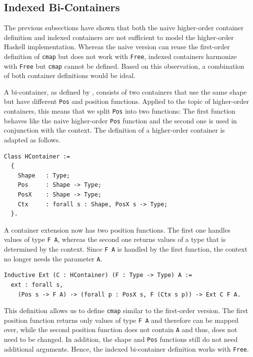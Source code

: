 \documentclass[a4paper, 11pt, fleqn, twoside]{scrreprt}
\newcommand{\cinl}[1]{\texttt{#1}}
\begin{document}
\subsection{Indexed Bi-Containers}
The previous subsections have shown that both the naive higher-order container definition and indexed containers are not sufficient to model the higher-order Haskell implementation.
Whereas the naive version can reuse the first-order definition of \cinl{cmap} but does not work with \cinl{Free}, indexed containers harmonize with \cinl{Free} but \cinl{cmap} cannot be defined.
Based on this observation, a combination of both container definitions would be ideal.

A bi-container, as defined by \citet{ghani2007higherDimensional}, consists of two containers that use the same shape but have different \cinl{Pos} and position functions.
Applied to the topic of higher-order containers, this means that we split \cinl{Pos} into two functions: The first function behaves like the naive higher-order \cinl{Pos} function and the second one is used in conjunction with the context.
The definition of a higher-order container is adapted as follows.

\begin{verbatim}
Class HContainer :=
  {
    Shape   : Type;
    Pos     : Shape -> Type;
    PosX    : Shape -> Type;
    Ctx     : forall s : Shape, PosX s -> Type;
  }.
\end{verbatim}

A container extension now has two position functions.
The first one handles values of type \cinl{F A}, whereas the second one returns values of a type that is determined by the context.
Since \cinl{F A} is handled by the first function, the context no longer needs the parameter \cinl{A}.

\begin{verbatim}
Inductive Ext (C : HContainer) (F : Type -> Type) A :=
  ext : forall s, 
    (Pos s -> F A) -> (forall p : PosX s, F (Ctx s p)) -> Ext C F A.
\end{verbatim}

This definition allows us to define \cinl{cmap} similar to the first-order version.
The first position function returns only values of type \cinl{F A} and therefore can be mapped over, while the second position function does not contain \cinl{A} and thus, does not need to be changed.
In addition, the shape and \cinl{Pos} functions still do not need additional arguments.
Hence, the indexed bi-container definition works with \cinl{Free}.
\end{document}
